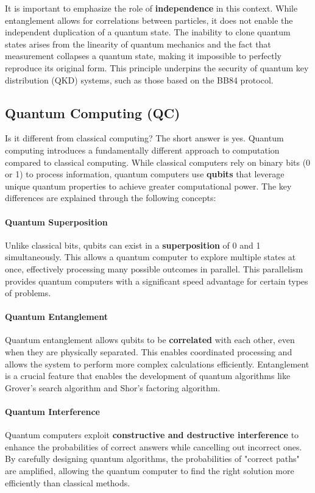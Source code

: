 It is important to emphasize the role of \textbf{independence} in this
context. While entanglement allows for correlations between particles,
it does not enable the independent duplication of a quantum state. The
inability to clone quantum states arises from the linearity of quantum
mechanics and the fact that measurement collapses a quantum state,
making it impossible to perfectly reproduce its original form. This
principle underpins the security of quantum key distribution (QKD)
systems, such as those based on the BB84 protocol.

\subsection{Quantum Computing (QC)}

Is it different from classical computing?  The short answer is yes. 
Quantum computing introduces a fundamentally different approach to
computation compared to classical computing. While classical computers
rely on binary bits (0 or 1) to process information, quantum computers
use \textbf{qubits} that leverage unique quantum properties to achieve
greater computational power. The key differences are explained through
the following concepts:

\paragraph{Quantum Superposition}  
Unlike classical bits, qubits can exist in a \textbf{superposition} of
0 and 1 simultaneously. This allows a quantum computer to explore
multiple states at once, effectively processing many possible outcomes
in parallel. This parallelism provides quantum computers with a
significant speed advantage for certain types of problems.

\paragraph{Quantum Entanglement}  
Quantum entanglement allows qubits to be \textbf{correlated} with each
other, even when they are physically separated. This enables
coordinated processing and allows the system to perform more complex
calculations efficiently. Entanglement is a crucial feature that
enables the development of quantum algorithms like Grover's search
algorithm and Shor's factoring algorithm.

\paragraph{Quantum Interference}  
Quantum computers exploit \textbf{constructive and destructive
interference} to enhance the probabilities of correct answers while
cancelling out incorrect ones. By carefully designing quantum
algorithms, the probabilities of "correct paths" are amplified,
allowing the quantum computer to find the right solution more
efficiently than classical methods.

